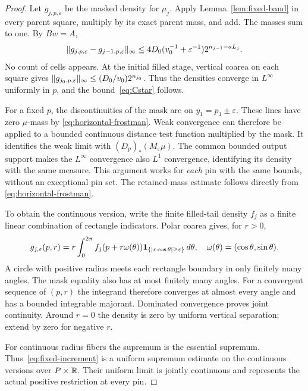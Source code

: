 \begin{proof}
Let $g_{j,p,\varepsilon}$ be the masked density for $\mu_j$.
Apply Lemma~\ref{lem:fixed-band} in every parent square, multiply by
its exact parent mass, and add. The masses sum to one. By $Bw=A$,
\begin{equation}\label{eq:fixed-increment}
 \lVert g_{j,p,\varepsilon}-g_{j-1,p,\varepsilon}\rVert_\infty
 \leq4D_0(v_0^{-1}+\varepsilon^{-1})2^{n_{j-1}-aL_j}.
\end{equation}
No count of cells appears. At the initial filled stage, vertical coarea
on each square gives
$\lVert g_{j_0,p,\varepsilon}\rVert_\infty\leq(D_0/v_0)2^{n_{j_0}}$.
Thus the densities converge in $L^\infty$ uniformly in $p$, and the
bound~\eqref{eq:Cstar} follows.

For a fixed $p$, the discontinuities of the mask are on
$y_1=p_1\pm\varepsilon$. These lines have zero $\mu$-mass by
\eqref{eq:horizontal-frostman}. Weak convergence can therefore be applied
to a bounded continuous distance test function multiplied by the mask.
It identifies the weak limit with $(D_p)_*(M_\varepsilon\mu)$.
The common bounded output support makes the $L^\infty$ convergence also
$L^1$ convergence, identifying its density with the same measure.
This argument works for \emph{each} pin with the same bounds, without an
exceptional pin set. The retained-mass estimate follows directly from
\eqref{eq:horizontal-frostman}.

To obtain the continuous version, write the finite filled-tail density
$f_j$ as a finite linear combination of rectangle indicators. Polar coarea
gives, for $r>0$,
\begin{equation}\label{eq:polar-continuity}
 g_{j,\varepsilon}(p,r)=r\int_0^{2\pi}
 f_j(p+r\omega(\theta))
 \mathbf 1_{\{|r\cos\theta|\geq\varepsilon\}}\,d\theta,
 \quad\omega(\theta)=(\cos\theta,\sin\theta).
\end{equation}
A circle with positive radius meets each rectangle boundary in only finitely
many angles. The mask equality also has at most finitely many angles.
For a convergent sequence of $(p,r)$ the integrand therefore converges at
almost every angle and has a bounded integrable majorant. Dominated
convergence proves joint continuity. Around $r=0$ the density is zero by
uniform vertical separation; extend by zero for negative $r$.

For continuous radius fibers the supremum is the essential supremum.
Thus~\eqref{eq:fixed-increment} is a uniform supremum estimate on the
continuous versions over $P\times\mathbb R$. Their uniform limit is jointly
continuous and represents the actual positive restriction at every pin.
\end{proof}

